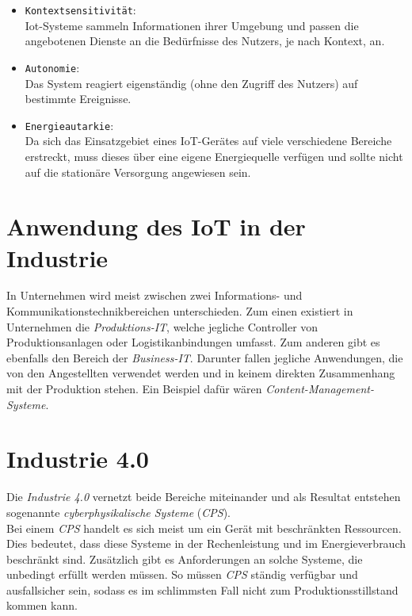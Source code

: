 \documentclass[conference]{IEEEtran}
\begin{document}
\begin{itemize}
  \item \texttt{Kontextsensitivität}: \\
  Iot-Systeme sammeln Informationen ihrer Umgebung und passen die angebotenen Dienste an die Bedürfnisse des Nutzers, je nach Kontext, an.  \newline
  \item \texttt{Autonomie}: \\ 
  Das System reagiert eigenständig (ohne den Zugriff des Nutzers) auf bestimmte Ereignisse. \newline
  \item \texttt{Energieautarkie}:\\ 
 Da sich das Einsatzgebiet eines IoT-Gerätes auf viele verschiedene Bereiche erstreckt, muss dieses über eine eigene Energiequelle verfügen und sollte nicht auf die stationäre Versorgung angewiesen sein.  
\end{itemize}


\section{Anwendung des IoT in der Industrie}

In Unternehmen wird meist zwischen zwei Informations- und Kommunikationstechnikbereichen unterschieden. Zum einen existiert in Unternehmen die \textit{Produktions-IT}, welche jegliche Controller von Produktionsanlagen oder Logistikanbindungen umfasst. Zum anderen gibt es ebenfalls den Bereich der \textit{Business-IT}. Darunter fallen jegliche Anwendungen, die von den Angestellten verwendet werden und in keinem direkten Zusammenhang mit der Produktion stehen. Ein Beispiel dafür wären \textit{Content-Management-Systeme}.\\

\section{Industrie 4.0}
Die \textit{Industrie 4.0} vernetzt beide Bereiche miteinander und als Resultat entstehen sogenannte \textit{cyberphysikalische Systeme} (\textit{CPS}).\\
Bei einem \textit{CPS} handelt es sich meist um ein Gerät mit beschränkten Ressourcen. Dies bedeutet, dass diese Systeme in der Rechenleistung und im Energieverbrauch beschränkt sind. Zusätzlich gibt es Anforderungen an solche Systeme, die unbedingt erfüllt werden müssen. So müssen \textit{CPS} ständig verfügbar und ausfallsicher sein, sodass es im schlimmsten Fall nicht zum Produktionsstillstand kommen kann.
\end{document}
